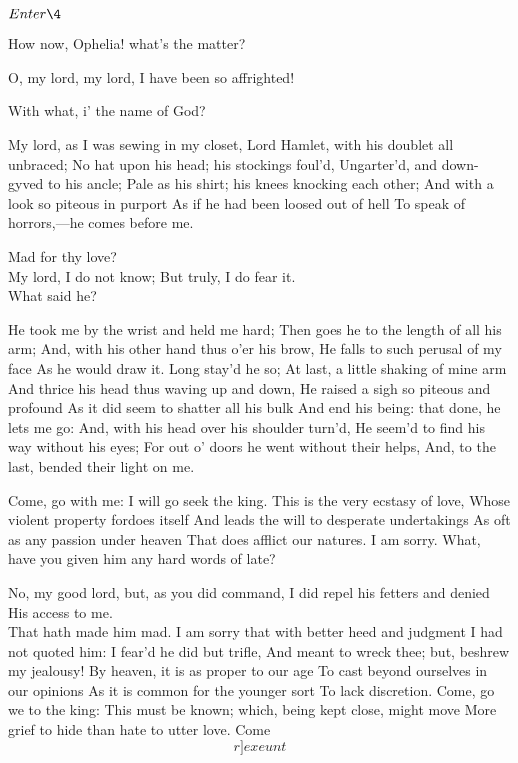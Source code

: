 \documentclass[11pt]{book}
\begin{document}
	\(Enter \4\)

	How now, Ophelia! what's the matter?

\4	O, my lord, my lord, I have been so affrighted!

\5	With what, i' the name of God?

\4	My lord, as I was sewing in my closet,
	Lord Hamlet, with his doublet all unbraced;
	No hat upon his head; his stockings foul'd,
	Ungarter'd, and down-gyved to his ancle;
	Pale as his shirt; his knees knocking each other;
	And with a look so piteous in purport
	As if he had been loosed out of hell
	To speak of horrors,---he comes before me.

\5	Mad for thy love?\\

\4	                  My lord, I do not know;
	But truly, I do fear it.\\

\5	What said he?

\4	He took me by the wrist and held me hard;
	Then goes he to the length of all his arm;
	And, with his other hand thus o'er his brow,
	He falls to such perusal of my face
	As he would draw it. Long stay'd he so;
	At last, a little shaking of mine arm
	And thrice his head thus waving up and down,
	He raised a sigh so piteous and profound
	As it did seem to shatter all his bulk
	And end his being: that done, he lets me go:
	And, with his head over his shoulder turn'd,
	He seem'd to find his way without his eyes;
	For out o' doors he went without their helps,
	And, to the last, bended their light on me.

\5	Come, go with me: I will go seek the king.
	This is the very ecstasy of love,
	Whose violent property fordoes itself
	And leads the will to desperate undertakings
	As oft as any passion under heaven
	That does afflict our natures. I am sorry.
	What, have you given him any hard words of late?

\4	No, my good lord, but, as you did command,
	I did repel his fetters and denied
	His access to me.\\

\5	                  That hath made him mad.
	I am sorry that with better heed and judgment
	I had not quoted him: I fear'd he did but trifle,
	And meant to wreck thee; but, beshrew my jealousy!
	By heaven, it is as proper to our age
	To cast beyond ourselves in our opinions
	As it is common for the younger sort
	To lack discretion. Come, go we to the king:
	This must be known; which, being kept close, might move
	More grief to hide than hate to utter love.
   Come 	\[r]exeunt\]
\end{document}
